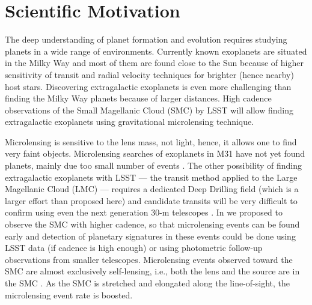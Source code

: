 \documentclass[12pt,letterpaper]{article}
\begin{document}
\clearpage

\section{Scientific Motivation}

The deep understanding of planet formation and evolution requires 
studying planets in a wide range of environments.  Currently known exoplanets 
are situated in the Milky Way and most of them are found close to the Sun 
because of higher sensitivity of transit and radial velocity techniques for 
brighter (hence nearby) host stars.  Discovering extragalactic exoplanets 
is even more challenging than finding the Milky Way planets because of 
larger distances.  High cadence observations of 
the Small Magellanic Cloud (SMC) by LSST will allow 
finding extragalactic exoplanets using gravitational microlensing 
technique.  

Microlensing is sensitive to the lens mass, not light, hence, 
it allows one to find very faint objects.  Microlensing searches of exoplanets in M31 
have not yet found planets, mainly due too small number of events 
\citep{ingrosso09,calchinovati14,lee15}.  The other possibility of 
finding extragalactic exoplanets with LSST --- the transit method applied 
to the Large Magellanic Cloud (LMC) --- requires a dedicated Deep Drilling field 
(which is a larger effort than proposed here) and candidate transits will be 
very difficult to confirm using even the next generation 30-m telescopes 
\citep{lund15,jacklin15}.  In \citet{mroz18b} we proposed to observe the SMC with 
higher cadence, so that microlensing events can be found early and 
detection of planetary signatures in these events could be done using 
LSST data (if cadence is high enough) or using photometric follow-up 
observations from smaller telescopes.  Microlensing events observed toward
the SMC are almost exclusively self-lensing, i.e., both the lens and the source are in the SMC \citep{sahu98,wyrzykowski11b}.  As the SMC is stretched and elongated 
along the line-of-sight, the microlensing event rate is boosted.
\end{document}
